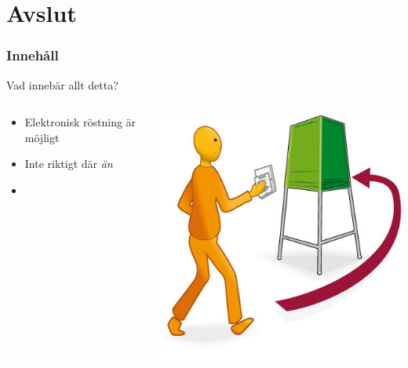 \section{Avslut}
\begin{frame}
\frametitle{Innehåll}
\tableofcontents[currentsection]
\end{frame}

\begin{frame}{Vad innebär allt detta?}



\begin{columns}
    \begin{column}{0.6\textwidth}
        \begin{itemize}
			\item Elektronisk röstning är möjligt
			\item Inte riktigt där \emph{än}
			\item %
		\end{itemize}
    \end{column}
	\begin{column}{0.4\textwidth}
    	\includegraphics[width=\textwidth]{images/rosta.jpg}
	\end{column}
\end{columns}

\end{frame}

